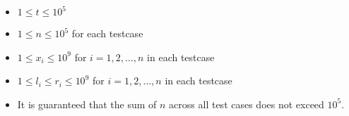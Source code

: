 \begin{itemize}
\tightlist
\item $1 \leq t \leq 10^5$
\item $1 \leq n \leq 10^5$ for each testcase
\item $1 \leq x_i \leq 10^9$ for $i = 1, 2, \ldots, n$ in each testcase
\item $1 \leq l_i \leq r_i \leq 10^9$ for $i = 1, 2, \ldots, n$ in each testcase
\item It is guaranteed that the sum of $n$ across all test cases does not exceed $10^5$.
\end{itemize}
